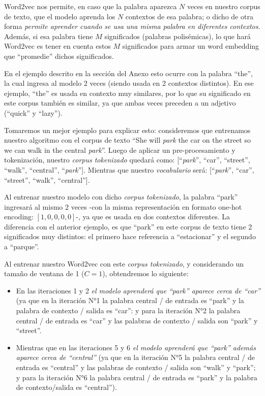 \documentclass[12pt,a4paper]{article}
\begin{document}
\begin{sloppypar}
Word2vec nos permite, en caso que la palabra aparezca $N$ veces en nuestro corpus de texto, que el modelo aprenda los $N$ contextos de esa palabra; o dicho de otra forma \textit{permite aprender cuando se usa una misma palabra en diferentes contextos}. Además, si esa palabra tiene $M$ significados (palabras polisémicas), lo que hará Word2vec es tener en cuenta estos $M$ significados para armar un word embedding que “promedie” dichos significados. 

En el ejemplo descrito en la sección del Anexo \textit{} esto ocurre con la palabra “the”, la cual ingresa al modelo 2 veces (siendo usada en 2 contextos distintos). En ese ejemplo, “the” es usada en contexto muy similares, por lo que su significado en este corpus también es similar, ya que ambas veces preceden a un adjetivo (“quick” y “lazy”).

Tomaremos un mejor ejemplo para explicar esto: consideremos que entrenamos nuestro algoritmo con el corpus de texto “She will \textit{park} the car on the street so we can walk in the central \textit{park}”.  Luego de aplicar un pre-procesamiento y tokenización, nuestro \textit{corpus tokenizado} quedará como: [“\textit{park}”, 
“car”, “street”, “walk”, “central”, “\textit{park}”]. Mientras que nuestro \textit{vocabulario} será: [“\textit{park}”, “car”, “street”, “walk”, “central”].

Al entrenar nuestro modelo con dicho \textit{corpus tokenizado}, la palabra “park” ingresará al mismo 2 veces -con la misma representación en formato one-hot encoding: $[1,0,0,0,0]$-, ya que es usada en dos contextos diferentes. La diferencia con el anterior ejemplo, es que “park” en este corpus de texto tiene 2 significados muy distintos: el primero hace referencia a “estacionar” y el segundo a “parque”. 

Al entrenar nuestro Word2vec con este \textit{corpus tokenizado}, y considerando un tamaño de ventana de 1 ($C=1$), obtendremos lo siguiente:

\begin{itemize}
\item En las iteraciones 1 y 2 \textit{el modelo aprenderá que “park” aparece cerca de “car”} (ya que en la iteración N°1 la palabra central / de entrada es “park” y la palabra de contexto / salida es “car”: y para la iteración N°2 la palabra central / de entrada es “car” y las palabras de contexto / salida son “park” y “street”. 
      
\item Mientras que en las iteraciones 5 y 6 \textit{el modelo aprenderá que “park” además aparece cerca de “central”} (ya que en la iteración N°5 la palabra central / de entrada es “central” y las palabras de contexto / salida son “walk” y “park”; y para la iteración N°6 la palabra central / de entrada es “park” y la palabra de contexto/salida es “central”).
\end{itemize}
      

\end{sloppypar}
\end{document}
